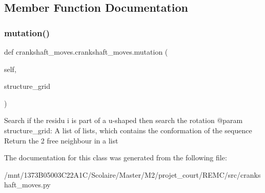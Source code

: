 \subsection{Member Function Documentation}
\mbox{\label{classcrankshaft__moves_1_1crankshaft__moves_a3f03860d511fcb97e6dd85f851a37c63}} 
\subsubsection{\texorpdfstring{mutation()}{mutation()}}
{\footnotesize\ttfamily def crankshaft\+\_\+moves.\+crankshaft\+\_\+moves.\+mutation (\begin{DoxyParamCaption}\item[{}]{self,  }\item[{}]{structure\+\_\+grid }\end{DoxyParamCaption})}

\begin{DoxyVerb}Search if the residu i is part of a u-shaped then search the
rotation
    @param structure_grid: A list of lists, which contains the
                   conformation of the sequence
    Return the 2 free neighbour in a list
\end{DoxyVerb}
 

The documentation for this class was generated from the following file\+:\begin{DoxyCompactItemize}
\item 
/mnt/1373\+B05003\+C22\+A1\+C/\+Scolaire/\+Master/\+M2/projet\+\_\+court/\+R\+E\+M\+C/src/crankshaft\+\_\+moves.\+py\end{DoxyCompactItemize}
